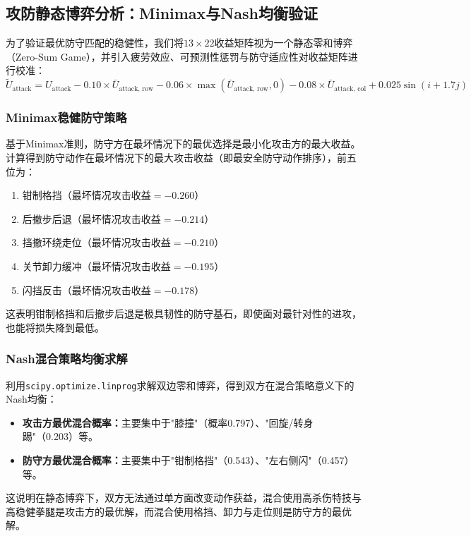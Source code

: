 \documentclass[a4paper,12pt]{article}
\numberwithin{equation}{section}
\numberwithin{table}{section}
\numberwithin{figure}{section}
\begin{document}
\subsection{攻防静态博弈分析：Minimax与Nash均衡验证}

为了验证最优防守匹配的稳健性，我们将$13 \times 22$收益矩阵视为一个静态零和博弈（Zero-Sum Game），并引入疲劳效应、可预测性惩罚与防守适应性对收益矩阵进行校准：
\begin{equation}
    \widetilde{U}_{\text{attack}} = U_{\text{attack}} - 0.10 \times \bar{U}_{\text{attack, row}} - 0.06 \times \max\left(\bar{U}_{\text{attack, row}}, 0\right) - 0.08 \times \bar{U}_{\text{attack, col}} + 0.025 \sin(i + 1.7j)
    \label{eq:utilde}
\end{equation}

\subsubsection{Minimax稳健防守策略}

基于Minimax准则，防守方在最坏情况下的最优选择是最小化攻击方的最大收益。计算得到防守动作在最坏情况下的最大攻击收益（即最安全防守动作排序），前五位为：
\begin{enumerate}
    \item 钳制格挡（最坏情况攻击收益$= -0.260$）
    \item 后撤步后退（最坏情况攻击收益$= -0.214$）
    \item 挡撤环绕走位（最坏情况攻击收益$= -0.210$）
    \item 关节卸力缓冲（最坏情况攻击收益$= -0.195$）
    \item 闪挡反击（最坏情况攻击收益$= -0.178$）
\end{enumerate}
这表明钳制格挡和后撤步后退是极具韧性的防守基石，即使面对最针对性的进攻，也能将损失降到最低。

\subsubsection{Nash混合策略均衡求解}

利用\texttt{scipy.optimize.linprog}求解双边零和博弈，得到双方在混合策略意义下的Nash均衡：
\begin{itemize}
    \item \textbf{攻击方最优混合概率：}主要集中于"膝撞"（概率0.797）、"回旋/转身踢"（0.203）等。
    \item \textbf{防守方最优混合概率：}主要集中于"钳制格挡"（0.543）、"左右侧闪"（0.457）等。
\end{itemize}
这说明在静态博弈下，双方无法通过单方面改变动作获益，混合使用高杀伤特技与高稳健拳腿是攻击方的最优解，而混合使用格挡、卸力与走位则是防守方的最优解。
\end{document}
